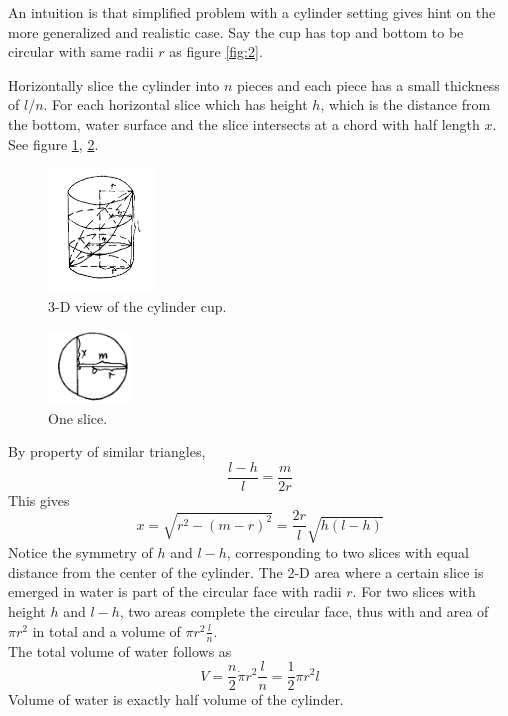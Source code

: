 \documentclass[a4paper]{article}
\begin{document}
An intuition is that simplified problem with a cylinder setting gives hint on the more generalized and realistic case. Say the cup has top and bottom to be circular with same radii $r$ as figure \ref{fig:2}. 



Horizontally slice the cylinder into $n$ pieces and each piece has a small thickness of $l/n$. For each horizontal slice which has height $h$, which is the distance from the bottom, water surface and the slice intersects at a chord with half length $x$. See figure \ref{fig:3}, \ref{fig:4}.\\


\begin{figure}[t]
\centering
\includegraphics[width=0.25\textwidth]{fig/3.png}
\caption{\label{fig:3}3-D view of the cylinder cup.}
\end{figure}

\begin{figure}[h]
\centering
\includegraphics[width=0.2\textwidth]{fig/4.png}
\caption{\label{fig:4}One slice.}
\end{figure}


By property of similar triangles, 
\[\frac{l - h}{l} = \frac{m}{2r}\]
This gives
\[x = \sqrt{r^2 - (m-r)^2} = \frac{2r}{l}\sqrt{h(l-h)}\]
Notice the symmetry of $h$ and $l-h$, corresponding to two slices with equal distance from the center of the cylinder. The 2-D area where a certain slice is emerged in water is part of the circular face with radii $r$. For two slices with height $h$ and $l-h$, two areas complete the circular face, thus with and area of $\pi r^2$ in total and a volume of $\pi r^2 \frac{l}{n}$. \\
The total volume of water follows as
\[V = \frac{n}{2} \dot \pi r^2 \frac{l}{n} = \frac{1}{2}\pi r^2 l\]
Volume of water is exactly half volume of the cylinder.
\end{document}
